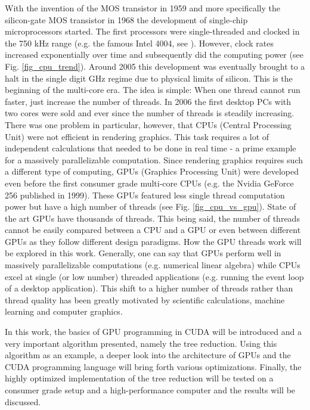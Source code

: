 With the invention of the MOS transistor in 1959 and more specifically the silicon-gate MOS transistor in 1968 the development of single-chip microprocessors started.
The first processors were single-threaded and clocked in the 750 kHz range (e.g. the famous Intel 4004, see \cite{Intel4004}).
However, clock rates increased exponentially over time and subsequently did the computing power (see Fig. \ref{fig_cpu_trend}).
Around 2005 this development was eventually brought to a halt in the single digit GHz regime due to physical limits of silicon. 
This is the beginning of the multi-core era. 
The idea is simple: When one thread cannot run faster, just increase the number of threads.
In 2006 the first desktop PCs with two cores were sold and ever since the number of threads is steadily increasing.
There was one problem in particular, however, that CPUs (Central Processing Unit) were not efficient in rendering graphics.
This task requires a lot of independent calculations that needed to be done in real time - a prime example for a massively parallelizable computation.
Since rendering graphics requires such a different type of computing, GPUs (Graphics Processing Unit) were developed even before the first consumer grade multi-core CPUs (e.g. the Nvidia GeForce 256 published in 1999).
These GPUs featured less single thread computation power but have a high number of threads (see Fig. \ref{fig_cpu_vs_gpu}).
State of the art GPUs have thousands of threads.
This being said, the number of threads cannot be easily compared between a CPU and a GPU or even between different GPUs as they follow different design paradigms.
How the GPU threads work will be explored in this work.
Generally, one can say that GPUs perform well in massively parallelizable computations (e.g. numerical linear algebra) while CPUs excel at single (or low number) threaded applications (e.g. running the event loop of a desktop application).
This shift to a higher number of threads rather than thread quality has been greatly motivated by scientific calculations, machine learning and computer graphics.

In this work, the basics of GPU programming in CUDA will be introduced and a very important algorithm presented, namely the tree reduction.
Using this algorithm as an example, a deeper look into the architecture of GPUs and the CUDA programming language will bring forth various optimizations.
Finally, the highly optimized implementation of the tree reduction will be tested on a consumer grade setup and a high-performance computer and the results will be discussed.

